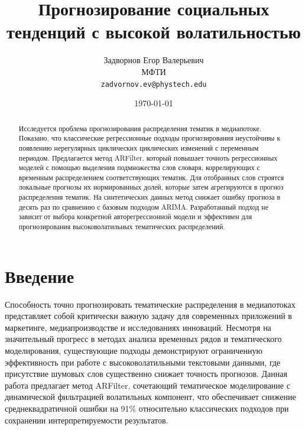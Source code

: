 \documentclass[14pt,a4paper]{article}
\title{Прогнозирование социальных тенденций с высокой волатильностью}
\author{
  Задворнов Егор Валерьевич \\
  МФТИ \\
  \texttt{zadvornov.ev@phystech.edu} \\
\date{\today}
}
\begin{document}




% 
\setcounter{page}{2}

\begin{abstract}
Исследуется проблема прогнозирования распределения тематик в медиапотоке. Показано, что классические регрессионные подходы прогнозирования неустойчивы к появлению нерегулярных циклических циклических изменений с переменным периодом. Предлагается метод ARFilter, который повышает точноть регрессионных моделей с помощью выделения подмножества слов словаря, коррелирующих с временным распределением соответствующих тематик. Для отобранных слов строятся локальные прогнозы их нормированных долей, которые затем агрегируются в прогноз распределения тематик. На синтетических данных метод снижает ошибку прогноза в десять раз по сравнению с базовым подходом ARIMA. Разработанный подход не зависит от выбора конкретной авторегрессионной модели и эффективен для прогнозирования высоковолатильных тематических распределений.
\end{abstract}




\newpage
\tableofcontents
\clearpage %


\newpage
\section{Введение}
Способность точно прогнозировать тематические распределения в медиапотоках представляет собой критически важную задачу для современных приложений в маркетинге, медиапроизводстве и исследованиях инноваций. Несмотря на значительный прогресс в методах анализа временных рядов и тематического моделирования, существующие подходы демонстрируют ограниченную эффективность при работе с высоковолатильными текстовыми данными, где присутствие шумовых слов существенно снижает точность прогнозов. Данная работа предлагает метод ARFilter, сочетающий тематическое моделирование с динамической фильтрацией волатильных компонент, что обеспечивает снижение среднеквадратичной ошибки на 91\% относительно классических подходов при сохранении интерпретируемости результатов.
\end{document}
